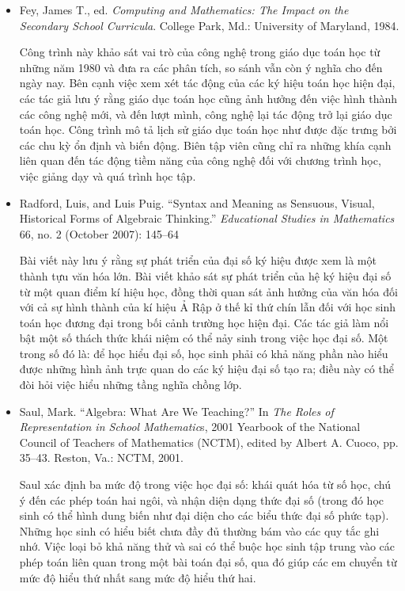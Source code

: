 \documentclass[
  10pt,
  a4paper,
  landscape,
  twoside,
  openany
]{scrbook}
\newcommand{\VI}[1]{#1}
\begin{document}
{
\VI{
  \begin{itemize}
    \item Fey, James T., ed. \emph{Computing and Mathematics: The Impact on the Secondary School Curricula}. College Park, Md.: University of Maryland, 1984.

      Công trình này khảo sát vai trò của công nghệ trong giáo dục toán học từ những năm 1980 và đưa ra các phân tích, so sánh vẫn còn ý nghĩa cho đến ngày nay. Bên cạnh việc xem xét tác động của các ký hiệu toán học hiện đại, các tác giả lưu ý rằng giáo dục toán học cũng ảnh hưởng đến việc hình thành các công nghệ mới, và đến lượt mình, công nghệ lại tác động trở lại giáo dục toán học. Công trình mô tả lịch sử giáo dục toán học như được đặc trưng bởi các chu kỳ ổn định và biến động. Biên tập viên cũng chỉ ra những khía cạnh liên quan đến tác động tiềm năng của công nghệ đối với chương trình học, việc giảng dạy và quá trình học tập.

    \item Radford, Luis, and Luis Puig. ``Syntax and Meaning as Sensuous, Visual, Historical Forms of Algebraic Thinking.'' \emph{Educational Studies in Mathematics} 66, no. 2 (October 2007): 145--64

      Bài viết này lưu ý rằng sự phát triển của đại số ký hiệu được xem là một thành tựu văn hóa lớn. Bài viết khảo sát sự phát triển của hệ ký hiệu đại số từ một quan điểm kí hiệu học, đồng thời quan sát ảnh hưởng của văn hóa đối với cả sự hình thành của kí hiệu Ả Rập ở thế kỉ thứ chín lẫn đối với học sinh toán học đương đại trong bối cảnh trường học hiện đại. Các tác giả làm nổi bật một số thách thức khái niệm có thể nảy sinh trong việc học đại số. Một trong số đó là: để học hiểu đại số, học sinh phải có khả năng phần nào hiểu được những hình ảnh trực quan do các ký hiệu đại số tạo ra; điều này có thể đòi hỏi việc hiểu những tầng nghĩa chồng lớp.

    \item Saul, Mark. ``Algebra: What Are We Teaching?'' In \emph{The Roles of Representation in School Mathematic}s, 2001 Yearbook of the National Council of Teachers of Mathematics (NCTM), edited by Albert A. Cuoco, pp. 35--43. Reston, Va.: NCTM, 2001.

      Saul xác định ba mức độ trong việc học đại số: khái quát hóa từ số học, chú ý đến các phép toán hai ngôi, và nhận diện dạng thức đại số (trong đó học sinh có thể hình dung biến như đại diện cho các biểu thức đại số phức tạp). Những học sinh có hiểu biết chưa đầy đủ thường bám vào các quy tắc ghi nhớ. Việc loại bỏ khả năng thử và sai có thể buộc học sinh tập trung vào các phép toán liên quan trong một bài toán đại số, qua đó giúp các em chuyển từ mức độ hiểu thứ nhất sang mức độ hiểu thứ hai.
    

\end{itemize}}}
\end{document}
